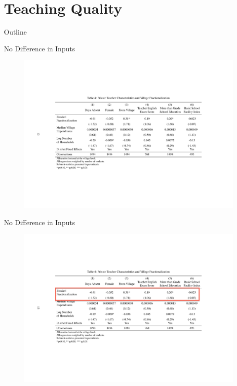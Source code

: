 \documentclass{beamer}
\begin{document}
\section{Teaching Quality}\label{}
\begin{frame}{Outline}
	\tableofcontents[currentsection]
\end{frame}

\begin{frame}{No Difference in Inputs}
	\begin{figure}[htb]
		\begin{center}
		\includegraphics[scale=0.5]{tables/Private_teacher_quality.pdf}
		\end{center}
	\end{figure}
\end{frame}

\begin{frame}{No Difference in Inputs}
	\begin{figure}[htb]
		\begin{center}
		\includegraphics[scale=0.5]{tables/Private_teacher_quality_box1.pdf}
		\end{center}
	\end{figure}
\end{frame}
\end{document}
